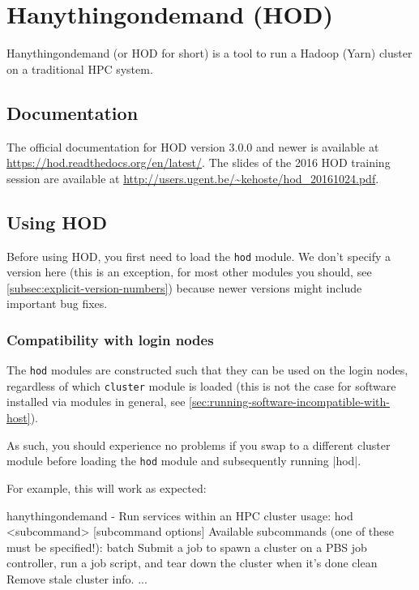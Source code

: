 \chapter{Hanythingondemand (HOD)}
\label{ch:hod}

Hanythingondemand (or HOD for short) is a tool to run a Hadoop (Yarn) cluster on
a traditional HPC system.

\section{Documentation}

The official documentation for HOD version 3.0.0 and newer is available at \url{https://hod.readthedocs.org/en/latest/}.
The slides of the 2016 HOD training session are available at \url{http://users.ugent.be/~kehoste/hod_20161024.pdf}.


\section{Using HOD}

Before using HOD, you first need to load the \lstinline|hod| module. We don't specify
a version here (this is an exception, for most other modules you should, see \autoref{subsec:explicit-version-numbers}) because newer versions
might include important bug fixes.

\begin{prompt}
\end{prompt}

\subsection{Compatibility with login nodes}

The \lstinline|hod| modules are constructed such that they can be used on the \hpcInfra login nodes,
regardless of which \lstinline|cluster| module is loaded (this is not the case for software installed
via modules in general, see \autoref{sec:running-software-incompatible-with-host}).

As such, you should experience no problems if you swap to a different cluster module
before loading the \lstinline|hod| module and subsequently running |hod|.

For example, this will work as expected:

\begin{prompt}
hanythingondemand - Run services within an HPC cluster
usage: hod <subcommand> [subcommand options]
Available subcommands (one of these must be specified!):
    batch           Submit a job to spawn a cluster on a PBS job controller, run a job script, and tear down the cluster when it's done
    clean           Remove stale cluster info.
...
\end{prompt}


